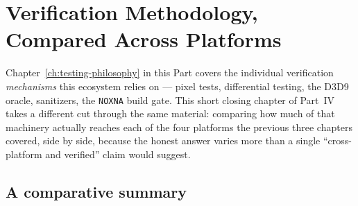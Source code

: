 \chapter{Verification Methodology, Compared Across Platforms}
\label{ch:verification-methodology}

Chapter~\ref{ch:testing-philosophy} in this Part covers the individual verification
\emph{mechanisms} this ecosystem relies on --- pixel tests, differential testing, the D3D9
oracle, sanitizers, the \texttt{NOXNA} build gate. This short closing chapter of Part~IV takes
a different cut through the same material: comparing how much of that machinery actually
reaches each of the four platforms the previous three chapters covered, side by side, because
the honest answer varies more than a single ``cross-platform and verified'' claim would
suggest.

\section{A comparative summary}

